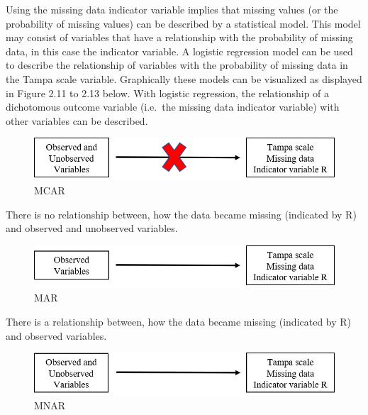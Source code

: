 \documentclass[]{book}
\begin{document}
Using the missing data indicator variable implies that missing values
(or the probability of missing values) can be described by a statistical
model. This model may consist of variables that have a relationship with
the probability of missing data, in this case the indicator variable. A
logistic regression model can be used to describe the relationship of
variables with the probability of missing data in the Tampa scale
variable. Graphically these models can be visualized as displayed in
Figure 2.11 to 2.13 below. With logistic regression, the relationship of
a dichotomous outcome variable (i.e.~the missing data indicator
variable) with other variables can be described.

\begin{figure}

{\centering \includegraphics[width=0.9\linewidth]{images/fig2.9a} 

}

\caption{MCAR}\label{fig:fig2-9a}
\end{figure}

There is no relationship between, how the data became missing (indicated
by R) and observed and unobserved variables.

\begin{figure}

{\centering \includegraphics[width=0.9\linewidth]{images/fig2.9b} 

}

\caption{MAR}\label{fig:fig2-9b}
\end{figure}

There is a relationship between, how the data became missing (indicated
by R) and observed variables.

\begin{figure}

{\centering \includegraphics[width=0.9\linewidth]{images/fig2.9c} 

}

\caption{MNAR}\label{fig:fig2-9c}
\end{figure}
\end{document}
